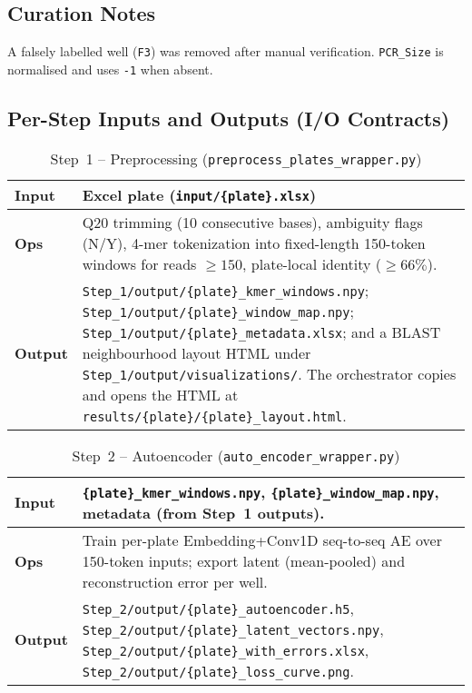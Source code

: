 \subsection{Curation Notes}
A falsely labelled well (\texttt{F3}) was removed after manual verification. \texttt{PCR\_Size} is normalised and uses \texttt{-1} when absent.

\subsection{Per-Step Inputs and Outputs (I/O Contracts)}
\label{sec:io_contracts}

\begin{table}[H]\centering
\caption{Step~1 -- Preprocessing (\texttt{preprocess\_plates\_wrapper.py})}
\begin{tabular}{|p{3.8cm}|p{9.8cm}|}\hline
\textbf{Input} & Excel plate (\texttt{input/\{plate\}.xlsx}) \\ \hline
\textbf{Ops} & Q20 trimming (10 consecutive bases), ambiguity flags (N/Y), 4-mer tokenization into fixed-length 150-token windows for reads $\geq 150$, plate-local identity ($\geq 66\%$). \\ \hline
\textbf{Output} & \texttt{Step\_1/output/\{plate\}\_kmer\_windows.npy}; \texttt{Step\_1/output/\{plate\}\_window\_map.npy}; \texttt{Step\_1/output/\{plate\}\_metadata.xlsx}; and a BLAST neighbourhood layout HTML under \texttt{Step\_1/output/visualizations/}. The orchestrator copies and opens the HTML at \texttt{results/\{plate\}/\{plate\}\_layout.html}. \\ \hline
\end{tabular}
\end{table}

\begin{table}[H]\centering
\caption{Step~2 -- Autoencoder (\texttt{auto\_encoder\_wrapper.py})}
\begin{tabular}{|p{3.8cm}|p{9.8cm}|}\hline
\textbf{Input} & \texttt{\{plate\}\_kmer\_windows.npy}, \texttt{\{plate\}\_window\_map.npy}, metadata (from Step~1 outputs). \\ \hline
\textbf{Ops} & Train per-plate Embedding+Conv1D seq-to-seq AE over 150-token inputs; export latent (mean-pooled) and reconstruction error per well. \\ \hline
\textbf{Output} & \texttt{Step\_2/output/\{plate\}\_autoencoder.h5}, \texttt{Step\_2/output/\{plate\}\_latent\_vectors.npy}, \texttt{Step\_2/output/\{plate\}\_with\_errors.xlsx}, \texttt{Step\_2/output/\{plate\}\_loss\_curve.png}. \\ \hline
\end{tabular}
\end{table}

